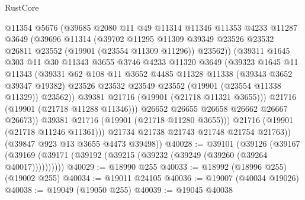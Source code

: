 \begin{lexlean}{RustCore}
\begin{coremodule}
                  @11354
                  @5676
                  (@39685
                    @2080
                    @11
                    @49
                    @11314
                    @11346
                    @11353
                    @4233
                    @11287
                    @3649
                    (@39696
                      @11314
                      (@39702
                        @11295
                        @11309
                        @39349
                        @23526
                        @23532
                        @26811
                        @23552
                        (@19901 (@23554 @11309 @11296))
                        @23562))
                    (@39311
                      @1645
                      @303
                      @11
                      @30
                      @11343
                      @3655
                      @3746
                      @4233
                      @11320
                      @3649
                      (@39323
                        @1645
                        @11
                        @11343
                        (@39331
                          @62
                          @108
                          @11
                          @3652
                          @4485
                          @11328
                          @11338
                          (@39343 @3652 @39347 @19382)
                          @23526
                          @23532
                          @23549
                          @23552
                          (@19901 (@23554 @11338 @11329))
                          @23562))
                      @39381
                      @21716
                      (@19901 (@21718 @11321 @3655)))
                    @21716
                    (@19901 (@21718 @11288 @11346)))
                  @26652
                  @26655
                  @26658
                  @26662
                  @26667
                  @26673))
              @39381
              @21716
              (@19901 (@21718 @11280 @3655)))
            @21716
            (@19901 (@21718 @11246 @11361)))
          @21734
          @21738
          @21743
          @21748
          @21754
          @21763))
      (@39847 @923 @13 @3655 @4473 @39498))
@40028 := @39101
    (@39126 (@39167 (@39169 (@39171 (@39192 (@39215 (@39232 (@39249 (@39260 (@39264 @40017))))))))))
@40029 := @18990 @255
@40033 := @18992 (@18996 @255) (@19002 @255)
@40034 := @19011 @24105
@40036 := @19007 (@40034 @19026)
@40038 := @19049 (@19050 @255)
@40039 := @19045 @40038

\end{coremodule}
\end{lexlean}
